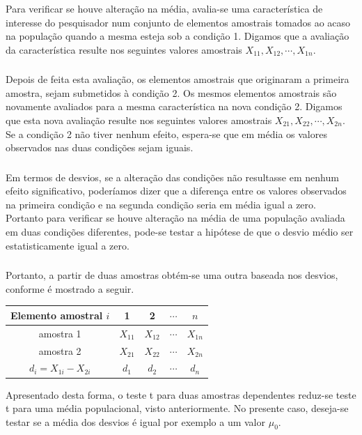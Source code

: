 \documentclass[14pt,aspectratio=1610]{beamer}
\begin{document}
\begin{frame}{}
\frametitle{}
\begin{block}{}
\justifying
Para verificar se houve alteração na média, avalia-se uma característica de interesse do pesquisador num conjunto de elementos amostrais tomados ao acaso na população quando a mesma esteja sob a condição 1. Digamos que a avaliação da característica resulte nos seguintes valores amostrais $X_{11},X_{12},\cdots,X_{1n}$.
\end{block}
\end{frame}

\begin{frame}{}
\frametitle{}
\begin{block}{}
\justifying
Depois de feita esta avaliação, os elementos amostrais que originaram a primeira amostra, sejam submetidos à condição 2. Os mesmos elementos amostrais são novamente avaliados para a mesma característica na nova condição 2. Digamos que esta nova avaliação resulte nos seguintes valores amostrais $X_{21},X_{22},\cdots,X_{2n}$. 
Se a condição 2 não tiver nenhum efeito, espera-se que em média os valores observados nas duas condições sejam iguais.
\end{block}
\end{frame}

\begin{frame}{}
\frametitle{}
\begin{block}{}
\justifying
Em termos de desvios, se a alteração das condições não resultasse em nenhum
efeito significativo, poderíamos dizer que a diferença entre os valores observados na
primeira condição e na segunda condição seria em média igual a zero. Portanto para
verificar se houve alteração na média de uma população avaliada em duas condições
diferentes, pode-se testar a hipótese de que o desvio médio ser estatisticamente igual a
zero.
\end{block}
\end{frame}

\begin{frame}{}
\frametitle{}
\begin{block}{}
\justifying
Portanto, a partir de duas amostras obtém-se uma outra baseada nos desvios, conforme é mostrado a seguir.
\begin{table}[]
\begin{tabular}{ccccc}
\hline \hline
Elemento amostral $i$& 1              &   2            & $\cdots$  & $n$ \\
\hline
amostra 1                    & $X_{11}$ & $X_{12}$ & $\cdots$ & $X_{1n}$ \\
amostra 2                    & $X_{21}$ & $X_{22}$ & $\cdots$ & $X_{2n}$ \\
\hline
 $d_{i}=X_{1i}-X_{2i}$& $d_{1}$   & $d_{2}$    & $\cdots$ & $d_{n}$\\
\hline
\end{tabular}
\end{table}
Apresentado desta forma, o teste t para duas amostras dependentes reduz-se teste t para uma média populacional, visto anteriormente. No presente caso, deseja-se testar
se a média dos desvios é igual por exemplo a um valor $\mu_{0}$.
\end{block}
\end{frame}
\end{document}
